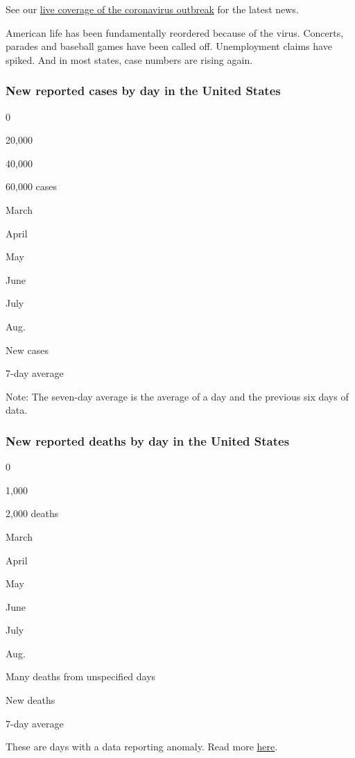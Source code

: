 See our
\href{https://www.nytimes3xbfgragh.onion/2020/08/02/world/coronavirus-covid-19.html}{live
coverage of the coronavirus outbreak} for the latest news.

American life has been fundamentally reordered because of the virus.
Concerts, parades and baseball games have been called off. Unemployment
claims have spiked. And in most states, case numbers are rising again.

\hypertarget{new-reported-cases-by-day-in-the-united-states}{%
\subsubsection{New reported cases by day in the United
States}\label{new-reported-cases-by-day-in-the-united-states}}

0

20,000

40,000

60,000 cases

March

April

May

June

July

Aug.

New cases

7-day average

Note: The seven-day average is the average of a day and the previous six
days of data.

\hypertarget{new-reported-deaths-by-day-in-the-united-states}{%
\subsubsection{New reported deaths by day in the United
States}\label{new-reported-deaths-by-day-in-the-united-states}}

0

1,000

2,000 deaths

March

April

May

June

July

Aug.

Many deaths from unspecified days

New deaths

7-day average

These are days with a data reporting anomaly. Read more
\protect\hyperlink{anomaly-notes}{here}.

